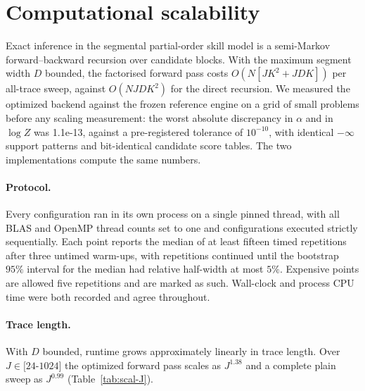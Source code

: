 
\section{Computational scalability}
\label{sec:scalability}

Exact inference in the segmental partial-order skill model is a semi-Markov
forward--backward recursion over candidate blocks. With the maximum segment width
$D$ bounded, the factorised forward pass costs $O(N[JK^2 + JDK])$ per all-trace
sweep, against $O(NJDK^2)$ for the direct recursion. We measured the optimized
backend against the frozen reference engine on a grid of small problems before any
scaling measurement: the worst absolute discrepancy in $\alpha$ and in $\log Z$ was
1.1e-13, against a
pre-registered tolerance of $10^{-10}$, with identical $-\infty$ support patterns
and bit-identical candidate score tables. The two implementations compute the same
numbers.

\paragraph{Protocol.}
Every configuration ran in its own process on a single pinned thread, with all BLAS
and OpenMP thread counts set to one and configurations executed strictly
sequentially. Each point reports the median of at least fifteen timed repetitions
after three untimed warm-ups, with repetitions continued until the bootstrap
$95\%$ interval for the median had relative half-width at most $5\%$. Expensive
points are allowed five repetitions and are marked as such. Wall-clock and process
CPU time were both recorded and agree throughout.

\paragraph{Trace length.}
With $D$ bounded, runtime grows approximately linearly in trace length. Over
$J \in [24$-$1024]$ the optimized forward pass scales as $J^{1.38}$ and a
complete plain sweep as $J^{0.99}$ (Table~\ref{tab:scal-J}).

